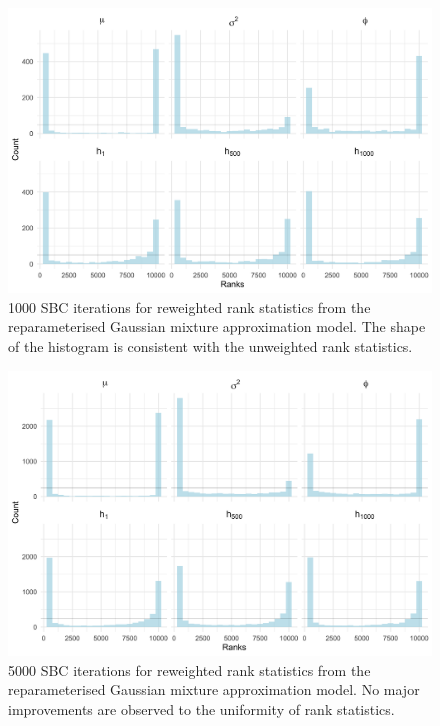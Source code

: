 \documentclass[12pt, a4paper]{article}
\begin{document}
\begin{figure}[H]
    \centering
    \includegraphics[scale=0.09]{results/weighted_ksc_ncp_1k.png}
    \caption{1000 SBC iterations for reweighted rank statistics from the reparameterised Gaussian mixture approximation model. The shape of the histogram is consistent with the unweighted rank statistics.}
    \label{fig:reweight1k}
\end{figure}

\begin{figure}[H]
    \centering
    \includegraphics[scale=0.09]{results/weighted_ksc_ncp_5k.png}
    \caption{5000 SBC iterations for reweighted rank statistics from the reparameterised Gaussian mixture approximation model. No major improvements are observed to the uniformity of rank statistics.}
    \label{fig:reweight5k}
\end{figure}
\end{document}
